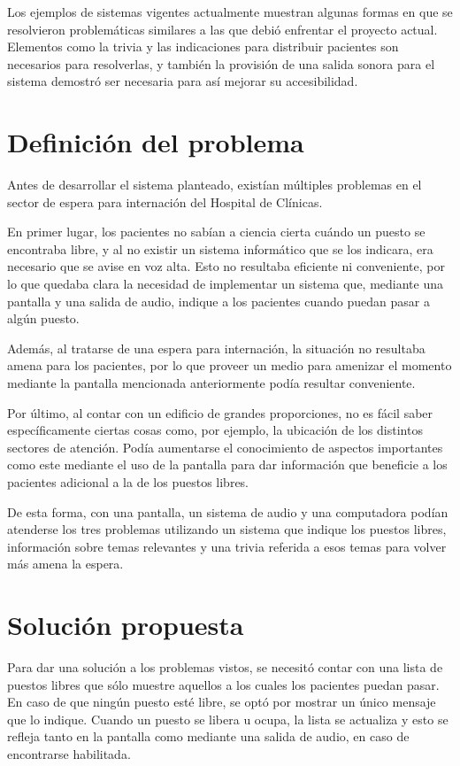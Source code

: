 \documentclass[twoside]{article}
\begin{document}
\vspace{-1.0\baselineskip}
Los ejemplos de sistemas vigentes actualmente muestran algunas formas en que se resolvieron problemáticas similares a las que debió enfrentar el proyecto actual. Elementos como la trivia y las indicaciones para distribuir pacientes son necesarios para resolverlas, y también la provisión de una salida sonora para el sistema demostró ser necesaria para así mejorar su accesibilidad.
\section{Definición del problema}
Antes de desarrollar el sistema planteado, existían múltiples problemas en el sector de espera para internación del Hospital de Clínicas.

En primer lugar, los pacientes no sabían a ciencia cierta cuándo un puesto se encontraba libre, y al no existir un sistema informático que se los indicara, era necesario que se avise en voz alta. Esto no resultaba eficiente ni conveniente, por lo que quedaba clara la necesidad de implementar un sistema que, mediante una pantalla y una salida de audio, indique a los pacientes cuando puedan pasar a algún puesto.

Además, al tratarse de una espera para internación, la situación no resultaba amena para los pacientes, por lo que proveer un medio para amenizar el momento mediante la pantalla mencionada anteriormente podía resultar conveniente.

Por último, al contar con un edificio de grandes proporciones, no es fácil saber específicamente ciertas cosas como, por ejemplo, la ubicación de los distintos sectores de atención. Podía aumentarse el conocimiento de aspectos importantes como este mediante el uso de la pantalla para dar información que beneficie a los pacientes adicional a la de los puestos libres.

De esta forma, con una pantalla, un sistema de audio y una computadora podían atenderse los tres problemas utilizando un sistema que indique los puestos libres, información sobre temas relevantes y una trivia referida a esos temas para volver más amena la espera.
\section{Solución propuesta}
Para dar una solución a los problemas vistos, se necesitó contar con una lista de puestos libres que sólo muestre aquellos a los cuales los pacientes puedan pasar. En caso de que ningún puesto esté libre, se optó por mostrar un único mensaje que lo indique. Cuando un puesto se libera u ocupa, la lista se actualiza y esto se refleja tanto en la pantalla como mediante una salida de audio, en caso de encontrarse habilitada.
\end{document}
